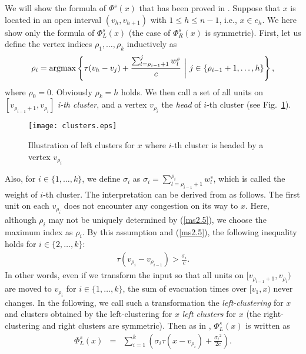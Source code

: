 \documentclass[a4paper]{llncs}
\newcommand{\argmax}{\operatornamewithlimits{argmax}}
\begin{document}
We will show the formula of $\Phi^s(x)$ that has been proved in \cite{hgk14_2,hgk14_4}.
Suppose that $x$ is located in an open interval $(v_h, v_{h+1})$ with $1 \le h \le n-1$, i.e., $x \in e_h$.
We here show only the formula of $\Phi^s_L(x)$ (the case of $\Phi^s_R(x)$ is symmetric).
First, let us define the vertex indices $\rho_1, \ldots, \rho_k$ inductively as
\begin{eqnarray}
	\rho_i = \argmax \left\{ \tau(v_h - v_j) + \frac{\sum_{l=\rho_{i-1}+1}^j w^s_l}{c} \ \bigg| \ j \in \{\rho_{i-1}+1, \ldots, h\} \right\},
\label{ms2.5}
\end{eqnarray}
where $\rho_0 = 0$.
Obviously $\rho_k = h$ holds.
We then call a set of all units on $[v_{\rho_{i-1}+1},v_{\rho_i}]$ {\it i-th cluster},
and a vertex $v_{\rho_i}$ the {\it head} of $i$-th cluster (see Fig.~\ref{fig:cl}).
\begin{figure}[b]
\centering
\texttt{[image: clusters.eps]} 
\caption{Illustration of left clusters for $x$ where $i$-th cluster is headed by a vertex $v_{\rho_i}$}
\label{fig:cl}
\end{figure}

\noindent
Also, for $i \in \{1, \ldots, k\}$, we define $\sigma_i$ as $\sigma_i = \sum_{l =\rho_{i-1}+1}^{\rho_i} w^s_l$,
which is called the weight of $i$-th cluster.
The interpretation can be derived from \cite{hgk14_2,hgk14_4} as follows.
The first unit on each $v_{\rho_i}$ does not encounter any congestion on its way to $x$. 
Here, although $\rho_i$ may not be uniquely determined by (\ref{ms2.5}),
we choose the maximum index as $\rho_i$.
By this assumption and (\ref{ms2.5}), the following inequality holds for $i \in \{2, \ldots, k\}$:
\begin{eqnarray}
\tau(v_{\rho_i}-v_{\rho_{i-1}}) > \frac{\sigma_i}{c}.
\label{eq:ms2.6}
\end{eqnarray}
In other words, even if we transform the input so that all units on $[v_{\rho_{i-1}+1},v_{\rho_i})$ are moved to $v_{\rho_i}$ for $i \in \{1, \ldots, k\}$,
the sum of evacuation times over $[v_1,x)$ never changes.
In the following, we call such a transformation the {\it left-clustering} for $x$ and
clusters obtained by the left-clustering for $x$ {\it left clusters} for $x$
(the right-clustering and right clusters are symmetric).
Then as in \cite{hgk14_2,hgk14_4}, $\Phi^s_L(x)$ is written as 
\begin{eqnarray}
\Phi^s_L(x)  	&=& \sum_{i=1}^k \left( \sigma_i\tau(x-v_{\rho_i}) + \frac{{\sigma_i}^2}{2c} \right). 
\label{eq:ms3}
\end{eqnarray}
\end{document}
